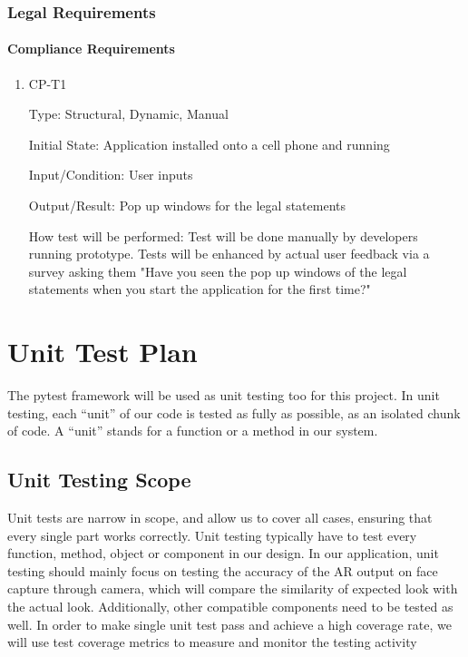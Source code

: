 \documentclass[12pt, titlepage]{article}
\begin{document}
\subsubsection{Legal Requirements}
		
\paragraph{Compliance Requirements}

\begin{enumerate}

\item{CP-T1\\}

Type: Structural, Dynamic, Manual
					
Initial State: Application installed onto a cell phone and running
					
Input/Condition: User inputs
					
Output/Result: Pop up windows for the legal statements
					
How test will be performed: Test will be done manually by developers running prototype. Tests will be enhanced by actual user feedback via a survey asking them "Have you seen the pop up windows of the legal statements when you start the application for the first time?"

\end{enumerate}

\section{Unit Test Plan}
The pytest framework will be used as unit testing too for this project. In unit testing, each “unit” of our code is tested as fully as possible, as an isolated chunk of code. A “unit” stands for a function or a method in our system.


\subsection{Unit Testing Scope}
Unit tests are narrow in scope, and allow us to cover all cases, ensuring that every single part works correctly. Unit testing typically have to test every function, method, object or component in our design. In our application, unit testing should mainly focus on testing the accuracy of the AR output on face capture through camera, which will compare the similarity of expected look with the actual look. Additionally, other compatible components need to be tested as well. In order to make single unit test pass and achieve a high coverage rate, we will use test coverage metrics to measure and monitor the testing activity\\
\end{document}
